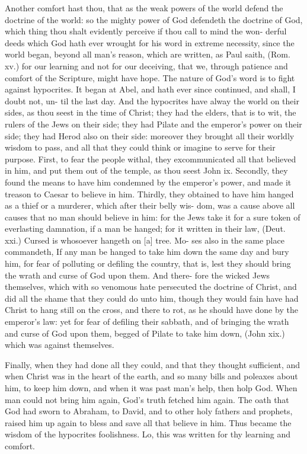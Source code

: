 \documentclass{custom}
\begin{document}
Another comfort hast thou, that as the weak 
powers of the world defend the doctrine of the 
world: so the mighty power of God defendeth 
the doctrine of God, which thing thou shalt 
evidently perceive if thou call to mind the won- 
derful deeds which God hath ever wrought for 
his word in extreme necessity, since the world 
began, beyond all man's reason, which are written, 
as Paul saith, (Rom. xv.) for our learning and not 
for our deceiving, that we, through patience 
and comfort of the Scripture, might have 
hope. The nature of God's word is to fight 
against hypocrites. It began at Abel, and hath 
ever since continued, and shall, I doubt not, un- 
til the last day. And the hypocrites have alway 
the world on their sides, as thou seest in the 
time of Christ; they had the elders, that is to
wit, the rulers of the Jews on their side; they 
had Pilate and the emperor's power on their side; 
they had Herod also on their side: moreover 
they brought all their worldly wisdom to pass, and 
all that they could think or imagine to serve for 
their purpose. First, to fear the people withal,
they excommunicated all that believed in him,
and put them out of the temple, as thou seest 
John ix. Secondly, they found the means to 
have him condemned by the emperor's power, and 
made it treason to Caesar to believe in him. 
Thirdly, they obtained to have him hanged as a 
thief or a murderer, which after their belly wis- 
dom, was a cause above all causes that no man 
should believe in him: for the Jews take it for a 
sure token of everlasting damnation, if a man be 
hanged; for it written in their law, (Deut. xxi.) 
Cursed is whosoever hangeth on [a] tree. Mo- 
ses also in the same place commandeth, If any 
man be hanged to take him down the same day 
and bury him, for fear of polluting or defiling 
the country, that is, lest they should bring the 
wrath and curse of God upon them. And there- 
fore the wicked Jews themselves, which with so 
venomous hate persecuted the doctrine of Christ, 
and did all the shame that they could do unto 
him, though they would fain have had Christ to 
hang still on the cross, and there to rot, as he 
should have done by the emperor's law: yet for 
fear of defiling their sabbath, and of bringing 
the wrath and curse of God upon them, begged 
of Pilate to take him down, (John xix.) which 
was against themselves. 

Finally, when they had done all they could, and 
that they thought sufficient, and when Christ was 
in the heart of the earth, and so many bills and 
poleaxes about him, to keep him down, and when 
it was past man's help, then holp God. When 
man could not bring him again, God's truth 
fetched him again. The oath that God had 
sworn to Abraham, to David, and to other holy 
fathers and prophets, raised him up again to bless 
and save all that believe in him. Thus became 
the wisdom of the hypocrites foolishness. Lo, this 
was written for thy learning and comfort.
\end{document}
